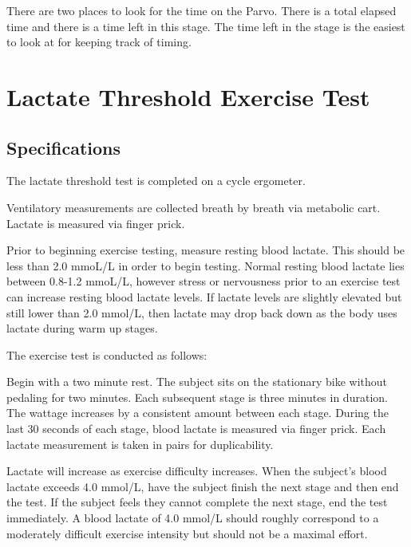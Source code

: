 \documentclass[
]{book}
\begin{document}
\begin{itemize}
\begin{itemize}
    There are two places to look for the time on the Parvo. There is a total elapsed time and there is a time left in this stage. The time left in the stage is the easiest to look at for keeping track of timing.
  \end{itemize}
\end{itemize}

\hypertarget{ExerciseTesting-LT}{%
\section{Lactate Threshold Exercise Test}\label{ExerciseTesting-LT}}

\hypertarget{ExerciseTesting-LT-Specs}{%
\subsection{Specifications}\label{ExerciseTesting-LT-Specs}}

The lactate threshold test is completed on a cycle ergometer.

Ventilatory measurements are collected breath by breath via metabolic cart.
Lactate is measured via finger prick.

Prior to beginning exercise testing, measure resting blood lactate. This should be less than 2.0 mmoL/L in order to begin testing. Normal resting blood lactate lies between 0.8-1.2 mmoL/L, however stress or nervousness prior to an exercise test can increase resting blood lactate levels. If lactate levels are slightly elevated but still lower than 2.0 mmol/L, then lactate may drop back down as the body uses lactate during warm up stages.

The exercise test is conducted as follows:

Begin with a two minute rest. The subject sits on the stationary bike without pedaling for two minutes.
Each subsequent stage is three minutes in duration. The wattage increases by a consistent amount between each stage. During the last 30 seconds of each stage, blood lactate is measured via finger prick. Each lactate measurement is taken in pairs for duplicability.

Lactate will increase as exercise difficulty increases. When the subject's blood lactate exceeds 4.0 mmol/L, have the subject finish the next stage and then end the test. If the subject feels they cannot complete the next stage, end the test immediately. A blood lactate of 4.0 mmol/L should roughly correspond to a moderately difficult exercise intensity but should not be a maximal effort.
\end{document}
